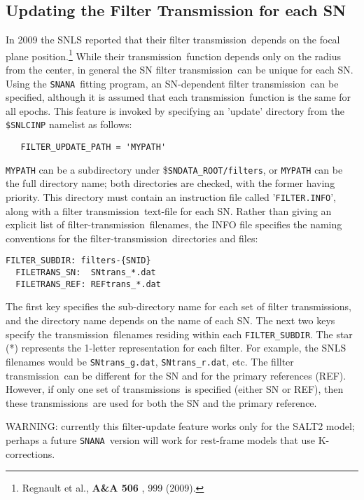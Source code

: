 \documentclass[12pt]{article}
\newcommand{\snana}{{\tt SNANA}}
\newcommand{\sndataroot}{{\tt SNDATA\_ROOT}}
\newcommand{\trans}{transmission}
\newcommand{\transs}{transmissions}
\begin{document}
   \subsection{Updating the Filter Transmission for each SN}
   \label{subsec:filter_update}

In 2009 the SNLS reported that their filter \trans\ depends
on the focal plane position.\footnote{Regnault et al., 
      {\bf A\&A 506} , 999 (2009).}
While their \trans\ function depends only on the radius 
from the center, in general the SN filter \trans\ can be 
unique for each SN.
Using the \snana\ fitting program, an SN-dependent filter \trans\
can be specified, although it is assumed that each \trans\ function
is the same for all epochs. This feature is invoked by specifying an
'update' directory from the {\tt \$SNLCINP} namelist as follows:
%
\begin{verbatim}
   FILTER_UPDATE_PATH = 'MYPATH'
\end{verbatim}
%
{\tt MYPATH} can be a subdirectory under
{\$\sndataroot}{\tt /filters}, 
or {\tt MYPATH} can be the full directory name;
both directories are checked, with the former having priority.
This directory must contain an instruction file called
'{\tt FILTER.INFO}', along with a filter \trans\ text-file
for each SN.
Rather than giving an explicit list of filter-\trans\
filenames, the INFO file specifies the naming conventions 
for the filter-\trans\ directories and files:
%
\begin{Verbatim}[frame=single]
  FILTER_SUBDIR: filters-{SNID}
  FILETRANS_SN:  SNtrans_*.dat
  FILETRANS_REF: REFtrans_*.dat
\end{Verbatim}
% 
The first key specifies the sub-directory name for each 
set of filter \transs, and the directory name depends on
the name of each SN. The next two keys specify the
\trans\ filenames residing within each {\tt FILTER\_SUBDIR}.
The star (*) represents the 1-letter representation for each filter. 
For example, the SNLS filenames would be 
{\tt SNtrans\_g.dat}, {\tt SNtrans\_r.dat}, etc.
The fillter \trans\ can be different for the SN
and for the primary references (REF). However, if only
one set of \transs\ is specified (either SN or REF),
then these \transs\ are used for both the SN and the
primary reference.


\bigskip
WARNING: currently this filter-update feature works 
only for the SALT2 model;
perhaps a future \snana\ version will work for 
rest-frame models that use K-corrections.
\end{document}
